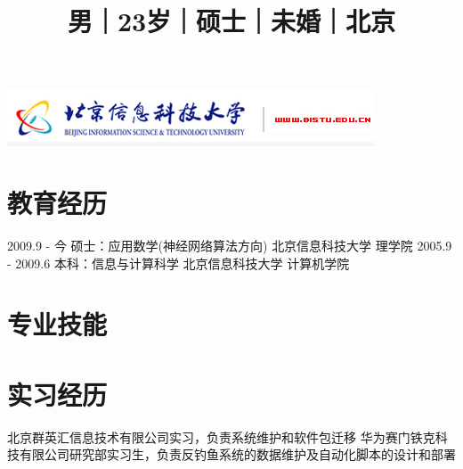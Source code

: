 \documentclass[a4paper]{moderncv}
\title{\small{男｜23岁｜硕士｜未婚｜北京}}
\begin{document}
\begin{CJK*}{UTF8}{gbsn}
\includegraphics{bistu_logo.png}

\maketitle

\section{教育经历}
\cventry
{2009.9 - 今}
{ 硕士：应用数学(神经网络算法方向) }
{ 北京信息科技大学 }
{ 理学院 }
{}
{}
\cventry
{2005.9 - 2009.6} { 本科：信息与计算科学 } { 北京信息科技大学 }
{ 计算机学院 } {} {}

\section{专业技能}

\section{实习经历}
{ 北京群英汇信息技术有限公司实习，负责系统维护和软件包迁移}
{ 华为赛门铁克科技有限公司研究部实习生，负责反钓鱼系统的数据维护及自动化脚本的设计和部署}

\end{CJK*}
\end{document}
